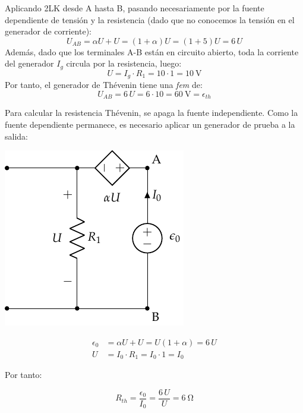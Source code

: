 \documentclass[10pt]{article}
\begin{document}
Aplicando 2LK desde A hasta B, pasando necesariamente por la fuente dependiente de tensión y la resistencia (dado que no conocemos la tensión en el generador de corriente):
\begin{equation*}
  U_{AB} = \alpha U + U = (1 + \alpha) U=(1+5)U=6\,U
\end{equation*}
Además, dado que los terminales A-B están en circuito abierto, toda la corriente del generador $I_g$ circula por la resistencia, luego:
\begin{equation*}
  U = I_g \cdot R_1=10\cdot 1 = \qty{10}{\volt}
\end{equation*}
Por tanto, el generador de Thévenin tiene una \textit{fem} de:
\begin{equation*}
  U_{AB} = 6\, U = 6\cdot 10 = \boxed{\qty{60}{\volt} = \epsilon_{th}}
\end{equation*}

Para calcular la resistencia Thévenin, se apaga la fuente independiente. Como la fuente dependiente permanece, es necesario aplicar un generador de prueba a la salida:

\vspace{3mm}

\begin{minipage}[c]{0.5\linewidth}
    \begin{center}
        \includegraphics[width=0.7\linewidth]{figs/Thevenin1_fuenteprueba.pdf}
    \end{center}
\end{minipage}
\begin{minipage}[c]{0.5\linewidth}    
    \begin{align*}
      \epsilon_0 &= \alpha U + U = U(1+\alpha) = 6\,U\\[5pt]
      U &= I_0\cdot R_1 = I_0\cdot 1 = I_0
    \end{align*}

    \vspace{3mm}
    Por tanto:

    \begin{equation*}
      R_{th} = \dfrac{\epsilon_0}{I_0}=\dfrac{6\,U}{U} = \boxed{\qty{6}{\ohm}}
    \end{equation*}
\end{minipage}
\end{document}
